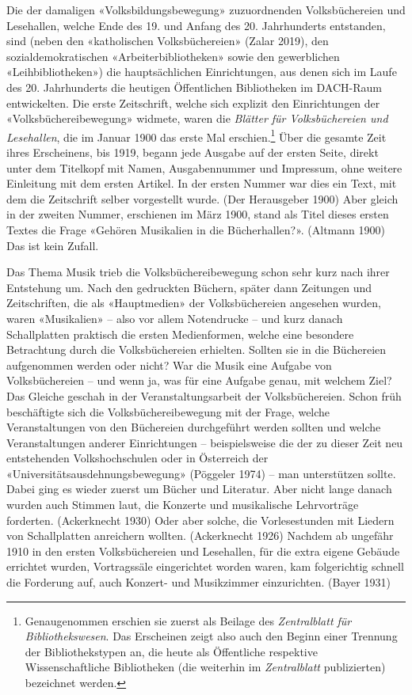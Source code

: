\documentclass[a4paper,
fontsize=11pt,
oneside,
numbers=noperiodatend,
parskip=half-,
bibliography=totoc,
final
]{scrartcl}
\begin{document}
Die der damaligen «Volksbildungsbewegung» zuzuordnenden Volksbüchereien
und Lesehallen, welche Ende des 19. und Anfang des 20. Jahrhunderts
entstanden, sind (neben den «katholischen Volksbüchereien» (Zalar 2019),
den sozialdemokratischen «Arbeiterbibliotheken» sowie den gewerblichen
«Leihbibliotheken») die hauptsächlichen Einrichtungen, aus denen sich im
Laufe des 20. Jahrhunderts die heutigen Öffentlichen Bibliotheken im
DACH-Raum entwickelten. Die erste Zeitschrift, welche sich explizit den
Einrichtungen der «Volksbüchereibewegung» widmete, waren die
\emph{Blätter für Volksbüchereien und Lesehallen}, die im Januar 1900
das erste Mal erschien.\footnote{Genaugenommen erschien sie zuerst als
  Beilage des \emph{Zentralblatt für Bibliothekswesen}. Das Erscheinen
  zeigt also auch den Beginn einer Trennung der Bibliothekstypen an, die
  heute als Öffentliche respektive Wissenschaftliche Bibliotheken (die
  weiterhin im \emph{Zentralblatt} publizierten) bezeichnet werden.}
Über die gesamte Zeit ihres Erscheinens, bis 1919, begann jede Ausgabe
auf der ersten Seite, direkt unter dem Titelkopf mit Namen,
Ausgabennummer und Impressum, ohne weitere Einleitung mit dem ersten
Artikel. In der ersten Nummer war dies ein Text, mit dem die Zeitschrift
selber vorgestellt wurde. (Der Herausgeber 1900) Aber gleich in der
zweiten Nummer, erschienen im März 1900, stand als Titel dieses ersten
Textes die Frage «Gehören Musikalien in die Bücherhallen?». (Altmann
1900) Das ist kein Zufall.

Das Thema Musik trieb die Volksbüchereibewegung schon sehr kurz nach
ihrer Entstehung um. Nach den gedruckten Büchern, später dann Zeitungen
und Zeitschriften, die als «Hauptmedien» der Volksbüchereien angesehen
wurden, waren «Musikalien» -- also vor allem Notendrucke -- und kurz
danach Schallplatten praktisch die ersten Medienformen, welche eine
besondere Betrachtung durch die Volksbüchereien erhielten. Sollten sie
in die Büchereien aufgenommen werden oder nicht? War die Musik eine
Aufgabe von Volksbüchereien -- und wenn ja, was für eine Aufgabe genau,
mit welchem Ziel? Das Gleiche geschah in der Veranstaltungsarbeit der
Volksbüchereien. Schon früh beschäftigte sich die Volksbüchereibewegung
mit der Frage, welche Veranstaltungen von den Büchereien durchgeführt
werden sollten und welche Veranstaltungen anderer Einrichtungen --
beispielsweise die der zu dieser Zeit neu entstehenden Volkshochschulen
oder in Österreich der «Universitätsausdehnungsbewegung» (Pöggeler 1974)
-- man unterstützen sollte. Dabei ging es wieder zuerst um Bücher und
Literatur. Aber nicht lange danach wurden auch Stimmen laut, die
Konzerte und musikalische Lehrvorträge forderten. (Ackerknecht 1930)
Oder aber solche, die Vorlesestunden mit Liedern von Schallplatten
anreichern wollten. (Ackerknecht 1926) Nachdem ab ungefähr 1910 in den
ersten Volksbüchereien und Lesehallen, für die extra eigene Gebäude
errichtet wurden, Vortragssäle eingerichtet worden waren, kam
folgerichtig schnell die Forderung auf, auch Konzert- und Musikzimmer
einzurichten. (Bayer 1931)
\end{document}
